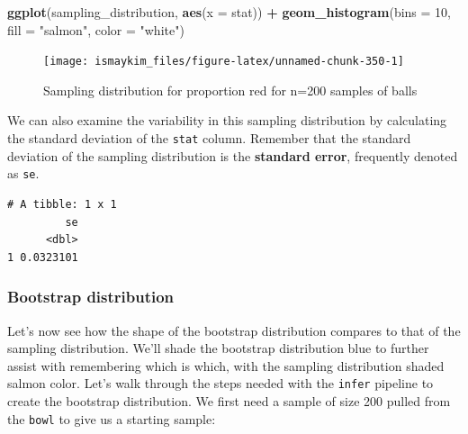 \documentclass[12pt, krantz2,]{krantz}
\makeatletter
\newenvironment{Shaded}{\begin{snugshade}}{\end{snugshade}}
\newcommand{\DataTypeTok}[1]{\textcolor[rgb]{0.27,0.27,0.27}{#1}}
\newcommand{\DecValTok}[1]{\textcolor[rgb]{0.06,0.06,0.06}{#1}}
\newcommand{\KeywordTok}[1]{\textcolor[rgb]{0.27,0.27,0.27}{\textbf{#1}}}
\newcommand{\NormalTok}[1]{#1}
\newcommand{\OperatorTok}[1]{\textcolor[rgb]{0.43,0.43,0.43}{\textbf{#1}}}
\newcommand{\StringTok}[1]{\textcolor[rgb]{0.5,0.5,0.5}{#1}}
\newenvironment{kframe}{%
\medskip{}
\setlength{\fboxsep}{.8em}
 \def\at@end@of@kframe{}%
 \ifinner\ifhmode%
  \def\at@end@of@kframe{\end{minipage}}%
  \begin{minipage}{\columnwidth}%
 \fi\fi%
 \def\FrameCommand##1{\hskip\@totalleftmargin \hskip-\fboxsep
 \colorbox{shadecolor}{##1}\hskip-\fboxsep
     \hskip-\linewidth \hskip-\@totalleftmargin \hskip\columnwidth}%
 \MakeFramed {\advance\hsize-\width
   \@totalleftmargin\z@ \linewidth\hsize
   \@setminipage}}%
 {\par\unskip\endMakeFramed%
 \at@end@of@kframe}
\renewenvironment{Shaded}{\begin{kframe}}{\end{kframe}}
\makeatother
\begin{document}
\begin{Shaded}
\begin{Highlighting}[]
\KeywordTok{ggplot}\NormalTok{(sampling_distribution, }\KeywordTok{aes}\NormalTok{(}\DataTypeTok{x =}\NormalTok{ stat)) }\OperatorTok{+}
\StringTok{  }\KeywordTok{geom_histogram}\NormalTok{(}\DataTypeTok{bins =} \DecValTok{10}\NormalTok{, }\DataTypeTok{fill =} \StringTok{"salmon"}\NormalTok{, }\DataTypeTok{color =} \StringTok{"white"}\NormalTok{)}
\end{Highlighting}
\end{Shaded}

\begin{figure}

{\centering \texttt{[image: ismaykim\_files/figure-latex/unnamed-chunk-350-1]} 

}

\caption{Sampling distribution for proportion red for n=200 samples of balls}\label{fig:unnamed-chunk-350}
\end{figure}

We can also examine the variability in this sampling distribution by calculating the standard deviation of the \texttt{stat} column. Remember that the standard deviation of the sampling distribution is the \textbf{standard error}, frequently denoted as \texttt{se}.

\begin{Shaded}
\end{Shaded}

\begin{verbatim}
# A tibble: 1 x 1
         se
      <dbl>
1 0.0323101
\end{verbatim}

\hypertarget{bootstrap-distribution-1}{%
\subsubsection*{Bootstrap distribution}\label{bootstrap-distribution-1}}


Let's now see how the shape of the bootstrap distribution compares to that of the sampling distribution. We'll shade the bootstrap distribution blue to further assist with remembering which is which, with the sampling distribution shaded salmon color. Let's walk through the steps needed with the \texttt{infer} pipeline to create the bootstrap distribution. We first need a sample of size 200 pulled from the \texttt{bowl} to give us a starting sample:
\end{document}
